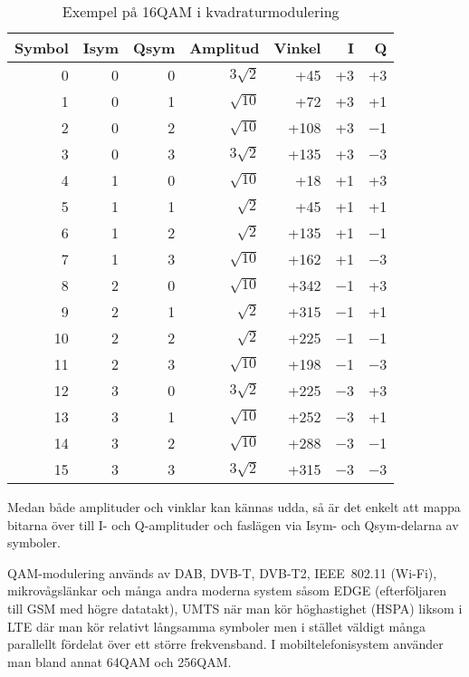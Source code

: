 \begin{table*}[ht]
\begin{center}
\begin{tabular}{|r|r|r|r|r|r|r|}
\hline
Symbol & Isym & Qsym & Amplitud      & Vinkel &  I &   Q \\ \hline
     0 &    0 &    0 & \(3\sqrt{2}\) &    +45 & +3 &  +3 \\
     1 &    0 &    1 & \(\sqrt{10}\) &    +72 & +3 &  +1 \\
     2 &    0 &    2 & \(\sqrt{10}\) &   +108 & +3 &  \num{-1} \\
     3 &    0 &    3 & \(3\sqrt{2}\) &   +135 & +3 &  \num{-3} \\
     4 &    1 &    0 & \(\sqrt{10}\) &    +18 & +1 &  +3 \\
     5 &    1 &    1 &  \(\sqrt{2}\) &    +45 & +1 &  +1 \\
     6 &    1 &    2 &  \(\sqrt{2}\) &   +135 & +1 &  \num{-1} \\
     7 &    1 &    3 & \(\sqrt{10}\) &   +162 & +1 &  \num{-3} \\
     8 &    2 &    0 & \(\sqrt{10}\) &   +342 & \num{-1} &  +3 \\
     9 &    2 &    1 &  \(\sqrt{2}\) &   +315 & \num{-1} &  +1 \\
    10 &    2 &    2 &  \(\sqrt{2}\) &   +225 & \num{-1} &  \num{-1} \\
    11 &    2 &    3 & \(\sqrt{10}\) &   +198 & \num{-1} &  \num{-3} \\
    12 &    3 &    0 & \(3\sqrt{2}\) &   +225 & \num{-3} &  +3 \\
    13 &    3 &    1 & \(\sqrt{10}\) &   +252 & \num{-3} &  +1 \\
    14 &    3 &    2 & \(\sqrt{10}\) &   +288 & \num{-3} &  \num{-1} \\
    15 &    3 &    3 & \(3\sqrt{2}\) &   +315 & \num{-3} &  \num{-3} \\ \hline
\end{tabular}
\end{center}
\caption{Exempel på 16QAM i kvadraturmodulering}
\label{tab:16QAM}
\end{table*}

Medan både amplituder och vinklar kan kännas udda, så är det enkelt
att mappa bitarna över till I- och Q-amplituder och faslägen via Isym- och
Qsym-delarna av symboler.

QAM-modulering används av DAB, DVB-T, DVB-T2, IEEE~802.11 (Wi-Fi),
mikrovågslänkar och många andra moderna system såsom EDGE
(efterföljaren till GSM med högre datatakt), UMTS när man kör
höghastighet (HSPA) liksom i LTE där man kör relativt långsamma
symboler men i stället väldigt många parallellt fördelat över ett
större frekvensband.
I mobiltelefonisystem använder man bland annat 64QAM och 256QAM.

